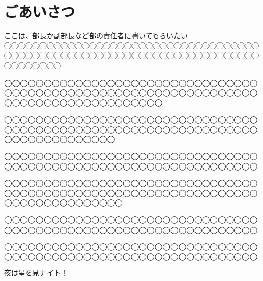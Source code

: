 \documentclass[../super_nova_20yy]{subfiles}
\begin{document}
\chapter{ごあいさつ}
\vspace{2\zw}
\begin{center}


	\phantom{a}\par
  ここは、部長か副部長など部の責任者に書いてもらいたい◯◯◯◯◯◯◯◯◯◯◯◯◯◯◯◯◯◯◯◯◯◯◯◯◯◯◯◯◯◯◯◯◯◯◯◯◯◯◯◯◯◯◯◯◯◯◯◯◯◯◯◯◯◯◯◯◯◯◯◯◯◯◯◯◯◯◯◯◯◯◯◯◯◯◯◯◯◯◯◯
	
	
	\phantom{a}\par
	◯◯◯◯◯◯◯◯◯◯◯◯◯◯◯◯◯◯◯◯◯◯◯◯◯◯◯◯◯◯◯◯◯◯◯◯◯◯◯◯◯◯◯◯◯◯◯◯◯◯◯◯◯◯◯◯◯◯◯◯◯◯◯◯◯◯◯◯◯◯◯◯◯◯◯◯◯◯◯◯◯◯◯◯
	
	\phantom{a}\par
  ◯◯◯◯◯◯◯◯◯◯◯◯◯◯◯◯◯◯◯◯◯◯◯◯◯◯◯◯◯◯◯◯◯◯◯◯◯◯◯◯◯◯◯◯◯◯◯◯◯◯◯◯◯◯◯◯◯◯◯◯◯◯◯◯◯◯◯◯◯◯◯◯◯◯◯◯◯◯
	
	
	\phantom{a}\par
  ◯◯◯◯◯◯◯◯◯◯◯◯◯◯◯◯◯◯◯◯◯◯◯◯◯◯◯◯◯◯◯◯◯◯◯◯◯◯◯◯◯◯◯◯◯◯◯◯◯◯◯◯◯◯◯◯◯◯◯◯◯◯◯◯
	
	
	\phantom{a}\par
  ◯◯◯◯◯◯◯◯◯◯◯◯◯◯◯◯◯◯◯◯◯◯◯◯◯◯◯◯◯◯◯◯◯◯◯◯◯◯◯◯◯◯◯◯◯◯◯◯◯◯◯◯◯◯◯◯◯◯◯◯◯◯◯◯◯◯◯◯◯◯◯◯◯◯◯◯◯◯◯
	
	
	\phantom{a}\par
  ◯◯◯◯◯◯◯◯◯◯◯◯◯◯◯◯◯◯◯◯◯◯◯◯◯◯◯◯◯◯◯◯◯◯◯◯◯◯◯◯◯◯◯◯◯◯◯◯◯◯◯◯◯◯◯◯◯◯◯◯◯◯◯◯
	
	
	\phantom{a}\par
  ◯◯◯◯◯◯◯◯◯◯◯◯◯◯◯◯◯◯◯◯◯◯◯◯◯◯◯◯◯◯◯◯◯◯◯◯◯◯◯◯◯◯◯◯◯◯◯◯◯◯◯◯◯◯◯◯◯◯◯◯◯◯◯◯
	
	
	\phantom{a}\par
	夜は星を見ナイト！
	
	
\end{center}
\vspace{5\zw}
\end{document}

